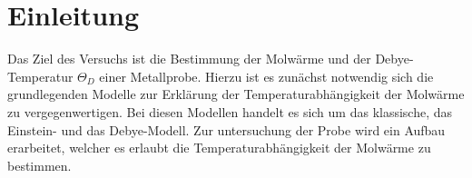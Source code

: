 \section{Einleitung}
Das Ziel des Versuchs ist die Bestimmung der Molwärme und der Debye-Temperatur $\Theta_D$ einer Metallprobe. Hierzu ist es zunächst notwendig sich die grundlegenden
Modelle zur Erklärung der Temperaturabhängigkeit der Molwärme zu vergegenwertigen. Bei diesen Modellen handelt es sich um das klassische, das Einstein- und das Debye-Modell.
Zur untersuchung der Probe wird ein Aufbau erarbeitet, welcher es erlaubt die Temperaturabhängigkeit der Molwärme zu bestimmen.
